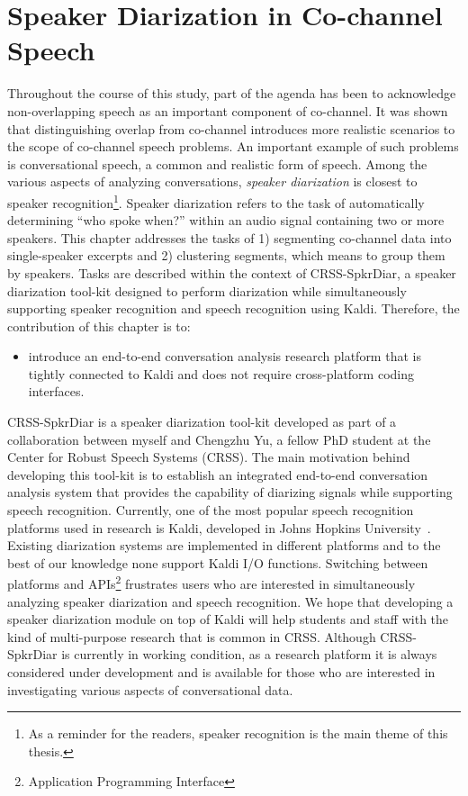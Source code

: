 
\chapter{Speaker Diarization in Co-channel Speech}
\label{chap:spkr_diar}

Throughout the course of this study, part of the agenda has been to acknowledge non-overlapping speech as an important component of co-channel. 
It was shown that distinguishing overlap from co-channel introduces more realistic scenarios to the scope of co-channel speech problems. 
An important example of such problems is conversational speech, a common and realistic form of speech. 
Among the various aspects of analyzing conversations, {\it speaker diarization} is closest to speaker recognition\footnote{As a reminder for the readers, speaker recognition is the main theme of this thesis.}.
Speaker diarization refers to the task of automatically determining ``who spoke when?'' within an audio signal containing two or more speakers. 
This chapter addresses the tasks of 1) segmenting co-channel data into single-speaker excerpts and 2) clustering segments, which means to group them by speakers. 
Tasks are described within the context of CRSS-SpkrDiar, a speaker diarization tool-kit designed to perform diarization while simultaneously supporting speaker recognition and speech recognition using Kaldi\cite{kaldi}. 
Therefore, the contribution of this chapter is to: 
\begin{itemize}
	\item introduce an end-to-end conversation analysis research platform that is tightly connected to Kaldi and does not require cross-platform coding interfaces. 
\end{itemize}

CRSS-SpkrDiar is a speaker diarization tool-kit developed as part of a collaboration between myself and Chengzhu Yu, a fellow PhD student at the Center for Robust Speech Systems (CRSS). 
The main motivation behind developing this tool-kit is to establish an integrated end-to-end conversation analysis system that provides the capability of diarizing  signals while supporting speech recognition. 
Currently, one of the most popular speech recognition platforms used in research is Kaldi, developed in Johns Hopkins University~\cite{kaldi}. 
Existing diarization systems are implemented in different platforms and to the best of our knowledge none support Kaldi I/O functions. 
Switching between platforms and APIs\footnote{Application Programming Interface} frustrates users who are interested in simultaneously analyzing speaker diarization and speech recognition. 
We hope that developing a speaker diarization module on top of Kaldi will help students and staff with the kind of multi-purpose research that is common in CRSS. 
Although CRSS-SpkrDiar is currently in working condition, as a research platform it is always considered under development and is available for those who are interested in investigating various aspects of conversational data. 

